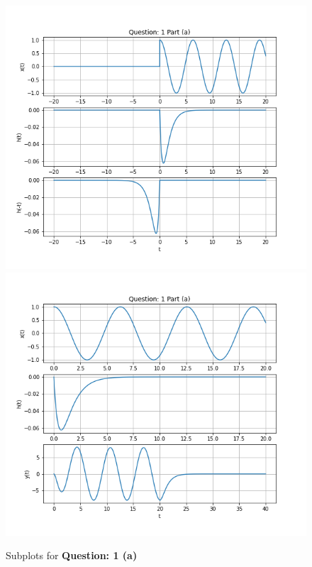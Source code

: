 \documentclass{article}
\begin{document}
    \begin{figure}[h]
        \centering
        \includegraphics[scale=0.39]{./Assets/1-a-i.png}
        \includegraphics[scale=0.39]{./Assets/1-a-ii.png}
        \caption*{Subplots for \textbf{Question: 1 (a)}}
    \end{figure}
\end{document}
